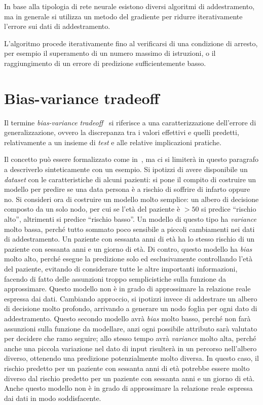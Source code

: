 In base alla tipologia di rete neurale esistono diversi algoritmi di addestramento, ma in generale si utilizza un metodo del gradiente per ridurre iterativamente l'errore sui dati di addestramento.

L'algoritmo procede iterativamente fino al verificarsi di una condizione di arresto, per esempio il superamento di un numero massimo di istruzioni, o il raggiungimento di un errore di predizione sufficientemente basso.

\section{Bias-variance tradeoff}\label{sec:bias_variance_tradeoff}
Il termine \emph{bias-variance tradeoff}~\cite{elements-of-statistical-learning} si riferisce a una caratterizzazione dell'errore di generalizzazione, ovvero la discrepanza tra i valori effettivi e quelli predetti, relativamente a un insieme di \emph{test} e alle relative implicazioni pratiche.

Il concetto può essere formalizzato come in~\cite{elements-of-statistical-learning}, ma ci si limiterà in questo paragrafo a descriverlo sinteticamente con un esempio.
Si ipotizzi di avere disponibile un \emph{dataset} con le caratteristiche di alcuni pazienti: si pone il compito di costruire un modello per predire se una data persona è a rischio di soffrire di infarto oppure no.
Si consideri ora di costruire un modello molto semplice: un albero di decisione composto da un solo nodo, per cui se l'età del paziente è $>50$ si predice ``rischio alto'', altrimenti si predice ``rischio basso''.
Un modello di questo tipo ha \emph{variance} molto bassa, perché tutto sommato poco sensibile a piccoli cambiamenti nei dati di addestramento. Un paziente con sessanta anni di età ha lo stesso rischio di un paziente con sessanta anni e un giorno di età.
Di contro, questo modello ha \emph{bias} molto alto, perché esegue la predizione solo ed esclusivamente controllando l'età del paziente, evitando di considerare tutte le altre importanti informazioni, facendo di fatto delle assunzioni troppo semplicistiche sulla funzione da approssimare. 
Questo modello non è in grado di approssimare la relazione reale espressa dai dati.
Cambiando approccio, si ipotizzi invece di addestrare un albero di decisione molto profondo, arrivando a generare un nodo foglia per ogni dato di addestramento.
Questo secondo modello avrà \emph{bias} molto basso, perché non farà assunzioni sulla funzione da modellare, anzi ogni possibile attributo sarà valutato per decidere che ramo seguire; allo stesso tempo avrà \emph{variance} molto alta, perché anche una piccola variazione nel dato di input risulterà in un percorso nell'albero diverso, ottenendo una predizione potenzialmente molto diversa.
In questo caso, il rischio predetto per un paziente con sessanta anni di età potrebbe essere molto diverso dal rischio predetto per un paziente con sessanta anni e un giorno di età.
Anche questo modello non è in grado di approssimare la relazione reale espressa dai dati in modo soddisfacente.

